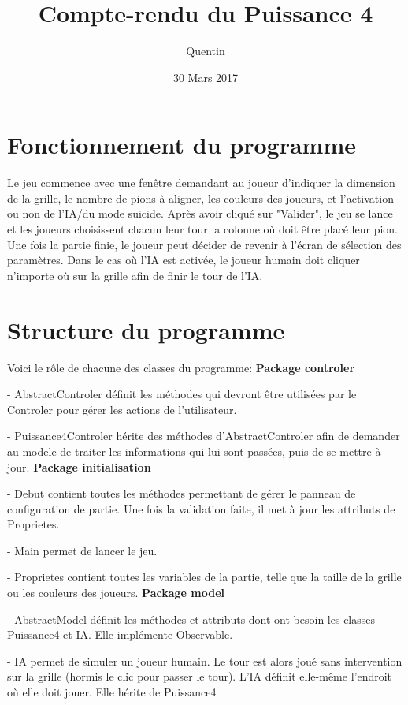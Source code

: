 \documentclass{report}
\title{Compte-rendu du Puissance 4}
\author{Quentin \bsc{SAUVAGE}}
\date{30 Mars 2017}
\begin{document}
\maketitle
\chapter{Fonctionnement du programme}
Le jeu commence avec une fenêtre demandant au joueur d'indiquer la dimension de la grille, le nombre de pions à aligner, les couleurs des joueurs, et l'activation ou non de l'IA/du mode suicide. Après avoir cliqué sur "Valider", le jeu se lance et les joueurs choisissent chacun leur tour la colonne où doit être placé leur pion. Une fois la partie finie, le joueur peut décider de revenir à l'écran de sélection des paramètres.
Dans le cas où l'IA est activée, le joueur humain doit cliquer n'importe où sur la grille afin de finir le tour de l'IA.

\chapter{Structure du programme}

Voici le rôle de chacune des classes du programme:
\bigbreak
\textbf{Package controler} 

- AbstractControler définit les méthodes qui devront être utilisées par le Controler pour gérer les actions de l'utilisateur.

- Puissance4Controler hérite des méthodes d'AbstractControler afin de demander au modele de traiter les informations qui lui sont passées, puis de se mettre à jour.
\bigbreak
\textbf{Package initialisation} 

- Debut contient toutes les méthodes permettant de gérer le panneau de configuration de partie. Une fois la validation faite, il met à jour les attributs de Proprietes.

- Main permet de lancer le jeu.

- Proprietes contient toutes les variables de la partie, telle que la taille de la grille ou les couleurs des joueurs.
\bigbreak
\textbf{Package model}

- AbstractModel définit les méthodes et attributs dont ont besoin les classes Puissance4 et IA. Elle implémente Observable.

- IA permet de simuler un joueur humain. Le tour est alors joué sans intervention sur la grille (hormis le clic pour passer le tour). L'IA définit elle-même l'endroit où elle doit jouer. Elle hérite de Puissance4
\end{document}
